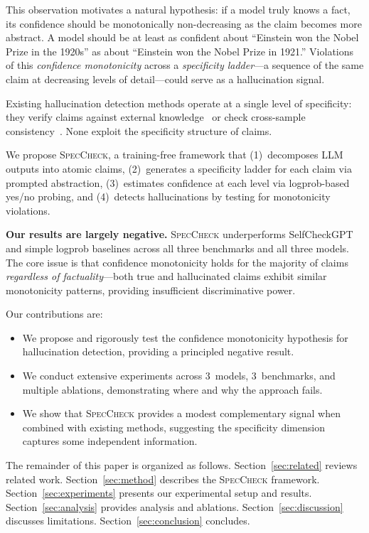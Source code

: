 \documentclass{article}
\newcommand{\speccheck}{\textsc{SpecCheck}}
\begin{document}
This observation motivates a natural hypothesis: if a model truly knows a fact, its confidence should be monotonically non-decreasing as the claim becomes more abstract.
A model should be at least as confident about ``Einstein won the Nobel Prize in the 1920s'' as about ``Einstein won the Nobel Prize in 1921.''
Violations of this \emph{confidence monotonicity} across a \emph{specificity ladder}---a sequence of the same claim at decreasing levels of detail---could serve as a hallucination signal.

Existing hallucination detection methods operate at a single level of specificity: they verify claims against external knowledge~\citep{min2023factscore, wei2024longform} or check cross-sample consistency~\citep{manakul2023selfcheckgpt, farquhar2024detecting}.
None exploit the specificity structure of claims.

We propose \speccheck{}, a training-free framework that (1)~decomposes LLM outputs into atomic claims, (2)~generates a specificity ladder for each claim via prompted abstraction, (3)~estimates confidence at each level via logprob-based yes/no probing, and (4)~detects hallucinations by testing for monotonicity violations.

\textbf{Our results are largely negative.}
\speccheck{} underperforms SelfCheckGPT and simple logprob baselines across all three benchmarks and all three models.
The core issue is that confidence monotonicity holds for the majority of claims \emph{regardless of factuality}---both true and hallucinated claims exhibit similar monotonicity patterns, providing insufficient discriminative power.

Our contributions are:
\begin{itemize}
    \item We propose and rigorously test the confidence monotonicity hypothesis for hallucination detection, providing a principled negative result.
    \item We conduct extensive experiments across 3~models, 3~benchmarks, and multiple ablations, demonstrating where and why the approach fails.
    \item We show that \speccheck{} provides a modest complementary signal when combined with existing methods, suggesting the specificity dimension captures some independent information.
\end{itemize}

The remainder of this paper is organized as follows.
Section~\ref{sec:related} reviews related work.
Section~\ref{sec:method} describes the \speccheck{} framework.
Section~\ref{sec:experiments} presents our experimental setup and results.
Section~\ref{sec:analysis} provides analysis and ablations.
Section~\ref{sec:discussion} discusses limitations.
Section~\ref{sec:conclusion} concludes.
\end{document}
